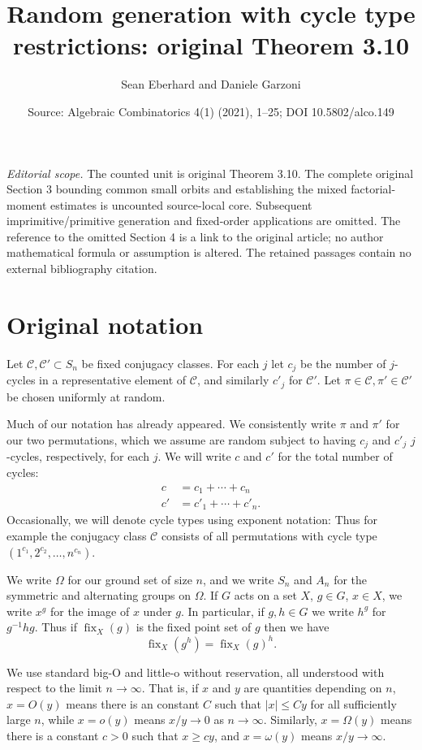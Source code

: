 \documentclass[10pt,a4paper]{amsart}
\title[Poisson approximation under cycle-type restrictions]{Random generation with cycle type restrictions: original Theorem 3.10}
\author{Sean Eberhard and Daniele Garzoni}
\date{Source: Algebraic Combinatorics 4(1) (2021), 1--25; DOI 10.5802/alco.149}
\theoremstyle{remark}
\DeclareMathOperator{\fix}{fix}
\newcommand\calC{\mathcal{C}}
\begin{document}
\maketitle
\noindent\textit{Editorial scope.} The counted unit is original Theorem 3.10. The complete original Section 3 bounding common small orbits and establishing the mixed factorial-moment estimates is uncounted source-local core. Subsequent imprimitive/primitive generation and fixed-order applications are omitted. The reference to the omitted Section 4 is a link to the original article; no author mathematical formula or assumption is altered. The retained passages contain no external bibliography citation.
\section{Original notation}
Let $\calC, \calC' \subset S_n$ be fixed conjugacy classes. For each $j$ let $c_j$ be the number of $j$-cycles in a representative element of $\calC$, and similarly $c'_j$ for $\calC'$. Let $\pi\in\calC, \pi'\in\calC'$ be chosen uniformly at random.

Much of our notation has already appeared. We consistently write $\pi$ and $\pi'$ for our two permutations, which we assume are random subject to having $c_j$ and $c'_j$ $j$-cycles, respectively, for each $j$. We will write $c$ and $c'$ for the total number of cycles:
\begin{align*}
 c&= c_1 + \cdots + c_n \\
 c'&= c'_1 + \cdots + c'_n.
\end{align*}
Occasionally, we will denote cycle types using exponent notation: Thus for example the conjugacy class $\calC$ consists of all permutations with cycle type $(1^{c_1}, 2^{c_2}, \dots, n^{c_n})$.

We write $\Omega$ for our ground set of size $n$, and we write $S_n$ and $A_n$ for the symmetric and alternating groups on $\Omega$. If $G$ acts on a set $X$, $g\in G$, $x \in X$, we write $x^g$ for the image of $x$ under $g$. In particular, if $g, h \in G$ we write $h^g$ for $g^{-1}hg$. Thus if $\fix_X(g)$ is the fixed point set of $g$ then we have
\[
 \fix_X(g^h) = \fix_X(g)^h.
\]

We use standard big-O and little-o without reservation, all understood with respect to the limit $n \to\infty$.
That is, if $x$ and $y$ are quantities depending on $n$, $x = O(y)$ means there is an constant $C$ such that $|x| \leq C y$ for all sufficiently large $n$,
while $x = o(y)$ means $x/y \to 0$ as $n\to\infty$.
Similarly, $x = \Omega(y)$ means there is a constant $c>0$ such that $x \geq c y$, and $x = \omega(y)$ means $x/y \to \infty$.
\end{document}
